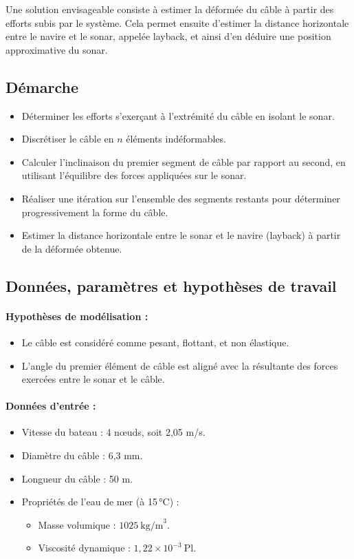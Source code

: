 \documentclass[12pt,a4paper]{report}
\begin{document}
Une solution envisageable consiste à estimer la déformée du câble à partir des efforts subis par le système.
Cela permet ensuite d’estimer la distance horizontale entre le navire et le sonar, appelée layback, et ainsi d’en déduire une position approximative du sonar.

\subsection{Démarche}

\begin{itemize}

 \item Déterminer les efforts s'exerçant à l'extrémité du câble en isolant le sonar.
 \item Discrétiser le câble en $n$ éléments indéformables.
 \item Calculer l'inclinaison du premier segment de câble par rapport au second, en utilisant l'équilibre des forces appliquées sur le sonar.
 \item Réaliser une itération sur l’ensemble des segments restants pour déterminer progressivement la forme du câble.
 \item Estimer la distance horizontale entre le sonar et le navire (layback) à partir de la déformée obtenue.

\end{itemize}

\subsection{Données, paramètres et hypothèses de travail}

\paragraph{Hypothèses de modélisation :}
\begin{itemize}
  \item Le câble est considéré comme pesant, flottant, et non élastique.
  \item L’angle du premier élément de câble est aligné avec la résultante des forces exercées entre le sonar et le câble.
\end{itemize}

\paragraph{Données d’entrée :}
\begin{itemize}
  \item Vitesse du bateau : 4 nœuds, soit 2{,}05 m/s.
  \item Diamètre du câble : 6{,}3 mm.
  \item Longueur du câble : 50 m.
  \item Propriétés de l’eau de mer (à 15\,°C) :
  \begin{itemize}
    \item Masse volumique : \( 1025~\text{kg/m}^3 \).
    \item Viscosité dynamique : \( 1{,}22 \times 10^{-3}~\text{Pl} \).
  \end{itemize}
\end{itemize}
\end{document}
